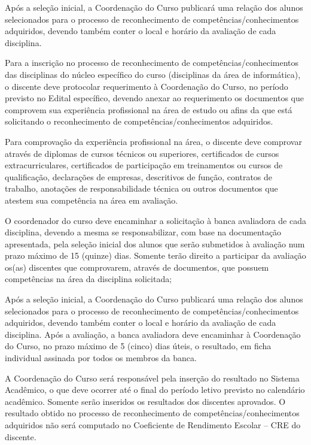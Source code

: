 	Após a seleção inicial, a Coordenação do Curso publicará uma relação dos alunos selecionados para o processo de reconhecimento de competências/conhecimentos adquiridos, devendo também conter o local e horário da avaliação de cada disciplina.
	
	Para a inscrição no processo de reconhecimento de competências/conhecimentos das disciplinas do núcleo específico do curso (disciplinas da área de informática), o discente deve protocolar requerimento à Coordenação do Curso, no período previsto no Edital específico, devendo anexar ao requerimento os documentos que comprovem sua experiência profissional na área de estudo ou afins da que está solicitando o reconhecimento de competências/conhecimentos adquiridos.
	
	Para comprovação da experiência profissional na área, o discente deve comprovar através de diplomas de cursos técnicos ou superiores, certificados de cursos extracurriculares, certificados de participação em treinamentos ou cursos de qualificação, declarações de empresas, descritivos de função, contratos de trabalho, anotações de responsabilidade técnica ou outros documentos que atestem sua competência na área em avaliação.
	
	O coordenador do curso deve encaminhar a solicitação à banca avaliadora de cada disciplina, devendo a mesma se responsabilizar, com base na documentação apresentada, pela seleção inicial dos alunos que serão submetidos à avaliação num prazo máximo de 15 (quinze) dias. Somente terão direito a participar da avaliação os(as) discentes que comprovarem, através de documentos, que possuem competências na área da disciplina solicitada;
	
	Após a seleção inicial, a Coordenação do Curso publicará uma relação dos alunos selecionados para o processo de reconhecimento de competências/conhecimentos adquiridos, devendo também conter o local e horário da avaliação de cada disciplina. Após a avaliação, a banca avaliadora deve encaminhar à Coordenação do Curso, no prazo máximo de 5 (cinco) dias úteis, o resultado, em ficha individual assinada por todos os membros da banca.
	
	A Coordenação do Curso será responsável pela inserção do resultado no Sistema Acadêmico, o que deve ocorrer até o final do período letivo previsto no calendário acadêmico. Somente serão inseridos os resultados dos discentes aprovados. O resultado obtido no processo de reconhecimento de competências/conhecimentos adquiridos não será computado no Coeficiente de Rendimento Escolar – CRE do discente.
	
